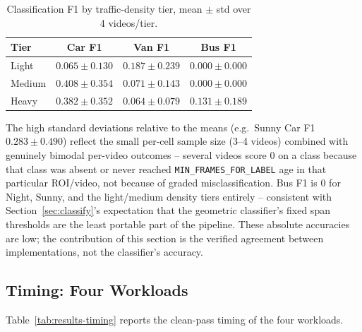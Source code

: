 \documentclass[conference]{IEEEtran}
\newcommand{\code}[1]{\texttt{#1}}
\begin{document}
\begin{table}[t]
\centering
\caption{Classification F1 by traffic-density tier, mean $\pm$ std over
4 videos/tier.}
\label{tab:accuracy-by-tier}
\footnotesize
\begin{tabular}{lccc}
\toprule
\textbf{Tier} & \textbf{Car F1} & \textbf{Van F1} & \textbf{Bus F1} \\
\midrule
Light  & $0.065 \pm 0.130$ & $0.187 \pm 0.239$ & $0.000 \pm 0.000$ \\
Medium & $0.408 \pm 0.354$ & $0.071 \pm 0.143$ & $0.000 \pm 0.000$ \\
Heavy  & $0.382 \pm 0.352$ & $0.064 \pm 0.079$ & $0.131 \pm 0.189$ \\
\bottomrule
\end{tabular}
\end{table}

The high standard deviations relative to the means (e.g.\ Sunny Car F1
$0.283 \pm 0.490$) reflect the small per-cell sample size (3--4 videos)
combined with genuinely bimodal per-video outcomes -- several videos
score 0 on a class because that class was absent or never reached
\code{MIN\_FRAMES\_FOR\_LABEL} age in that particular ROI/video, not
because of graded misclassification. Bus F1 is 0 for Night, Sunny, and
the light/medium density tiers entirely -- consistent with
Section~\ref{sec:classify}'s expectation that the geometric classifier's
fixed span thresholds are the least portable part of the pipeline.
These absolute accuracies are low; the contribution of this section is
the verified agreement between implementations, not the classifier's
accuracy.

\subsection{Timing: Four Workloads}
\label{sec:timing}
Table~\ref{tab:results-timing} reports the clean-pass timing of the four
workloads.
\end{document}
